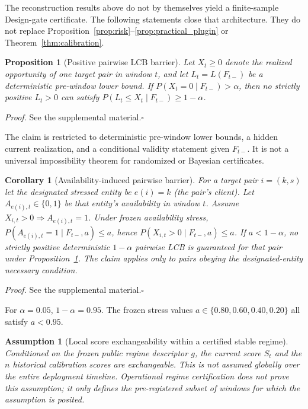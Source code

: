 \documentclass[letterpaper,journal]{IEEEtran}
\newtheorem{proposition}{Proposition}
\newtheorem{assumption}{Assumption}
\newtheorem{corollary}{Corollary}
\begin{document}
The reconstruction results above do not by themselves yield a finite-sample
Design-gate certificate.  The following statements close that architecture.
They do not replace Proposition~\ref{prop:risk}--\ref{prop:practical_plugin}
or Theorem~\ref{thm:calibration}.

\begin{proposition}[Positive pairwise LCB barrier]
\label{prop:pairwise-lcb-barrier}
Let $X_t\ge 0$ denote the realized opportunity of one target pair in window
$t$, and let $L_t=L(F_{t-})$ be a deterministic pre-window lower bound.  If
$P(X_t=0\mid F_{t-})>\alpha$, then no strictly positive $L_t>0$ can satisfy
$P(L_t\le X_t\mid F_{t-})\ge 1-\alpha$.
\end{proposition}

\noindent\emph{Proof.}
See the supplemental material.\hfill$\square$

The claim is restricted to deterministic pre-window lower bounds, a hidden
current realization, and a conditional validity statement given $F_{t-}$.  It
is not a universal impossibility theorem for randomized or Bayesian
certificates.

\begin{corollary}[Availability-induced pairwise barrier]
\label{cor:availability-barrier}
For a target pair $i=(k,s)$ let the designated stressed entity be $e(i)=k$
(the pair's client).  Let $A_{e(i),t}\in\{0,1\}$ be that entity's availability
in window $t$.  Assume $X_{i,t}>0\Rightarrow A_{e(i),t}=1$.  Under frozen
availability stress, $P(A_{e(i),t}=1\mid F_{t-},a)\le a$, hence
$P(X_{i,t}>0\mid F_{t-},a)\le a$.  If $a<1-\alpha$, no strictly positive
deterministic $1-\alpha$ pairwise LCB is guaranteed for that pair under
Proposition~\ref{prop:pairwise-lcb-barrier}.  The claim applies only to pairs
obeying the designated-entity necessary condition.
\end{corollary}

\noindent\emph{Proof.}
See the supplemental material.\hfill$\square$

For $\alpha=0.05$, $1-\alpha=0.95$.  The frozen stress values
$a\in\{0.80,0.60,0.40,0.20\}$ all satisfy $a<0.95$.

\begin{assumption}[Local score exchangeability within a certified stable regime]
\label{ass:score-exchangeability}
Conditioned on the frozen public regime descriptor $g$, the current score
$S_t$ and the $n$ historical calibration scores are exchangeable.  This is
not assumed globally over the entire deployment timeline.  Operational
regime certification does not prove this assumption; it only defines the
pre-registered subset of windows for which the assumption is posited.
\end{assumption}
\end{document}
